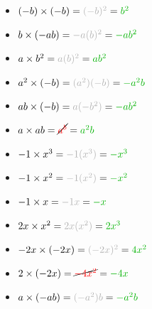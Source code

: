 \documentclass{article}
\begin{document}
\begin{minipage}[b]{0.3\linewidth}
    \begin{itemize}
        \item $(-b)\times (-b) = {\color{black!30}{{(-b)^2}}} = {\color{black!30!green}{b^2}}$
        \item $b\times (-ab) = {\color{black!30}{{-a(b)^2}}} = {\color{black!30!green}{-ab^2}}$
        \item $a\times b^2 = {\color{black!30}{{a(b)^2}}} = {\color{black!30!green}{ab^2}}$
        \item $a^2\times (-b) = {\color{black!30}{{(a^2)(-b)}}} = {\color{black!30!green}{-a^2b}}$
        \item $ab\times (-b) = {\color{black!30}{{a(-b^2)}}} = {\color{black!30!green}{-ab^2}}$
        \item $a\times ab = {\cancel{\color{red}{{a^b}}}} = {\color{black!30!green}{a^2b}}$
     \end{itemize}
\end{minipage}
\hspace{\fill}
\begin{minipage}[b]{0.3\linewidth}
    \begin{itemize}
         \item $-1\times x^3 = {\color{black!30}{-1(x^3)}} = {\color{black!30!green}{-x^3}}$
        \item $-1\times x^2 = {\color{black!30}{-1(x^2)}} = {\color{black!30!green}{-x^2}}$
        \item $-1\times x = {\color{black!30}{-1x}} = {\color{black!30!green}{-x}}$
        \item $2x\times x^2 = {\color{black!30}{2x(x^2)}} = {\color{black!30!green}{2x^3}}$
        \item $-2x\times (-2x) = {\color{black!30}{(-2x)^2}} = {\color{black!30!green}{4x^2}}$
        \item $2\times (-2x) = {\cancel{\color{red}{-4x^2}}} = {\color{black!30!green}{-4x}}$
        \item $a \times (-ab) = {\color{black!30}{(-a^2)b}} = {\color{black!30!green}{-a^2b}}$
    \end{itemize}
\end{minipage}
\hspace{\fill}
\end{document}
